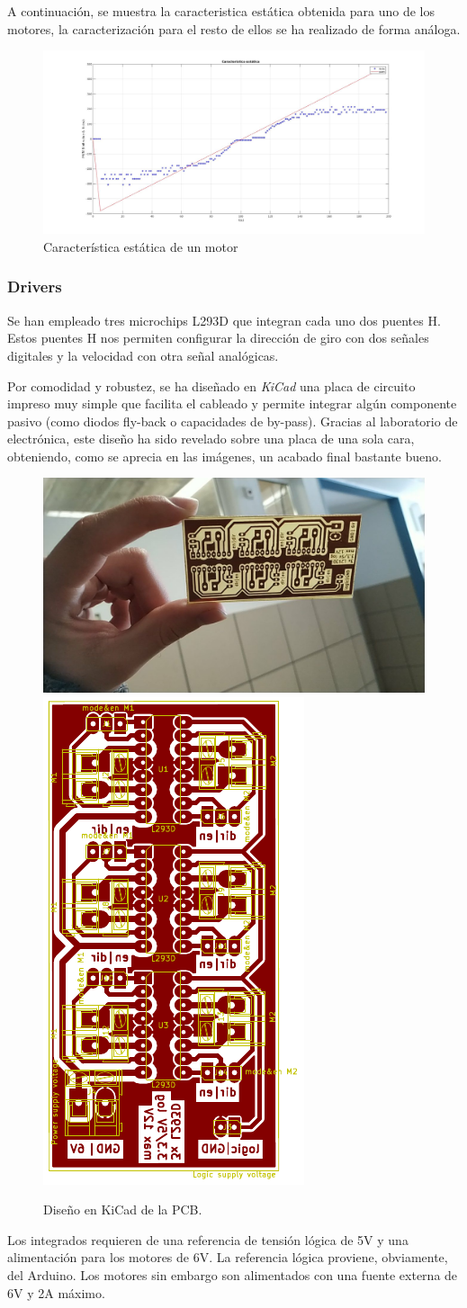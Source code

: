 A continuación, se muestra la caracteristica estática obtenida para uno de los motores, la caracterización para el resto de ellos se ha realizado de forma análoga. 
\begin{figure}[h!]
	\centering
	\includegraphics[width=.6\textwidth]{images/hw/estatica}
	\caption{Característica estática de un motor}
\end{figure}


\subsubsection{Drivers}
Se han empleado tres microchips L293D que integran cada uno dos puentes H. Estos puentes H nos permiten configurar la dirección de giro con dos señales digitales y la velocidad con otra señal analógicas.\par
Por comodidad y robustez, se ha diseñado en \textit{KiCad} una placa de circuito impreso muy simple que facilita el cableado y permite integrar algún 
componente pasivo (como diodos fly-back o capacidades de by-pass).
Gracias al laboratorio de electrónica, este diseño ha sido revelado sobre una placa de una sola cara, obteniendo, como se aprecia en las imágenes, 
un acabado final bastante bueno.
 \begin{figure}[h!]
	 \centering
	 \includegraphics[width=.6\textwidth]{images/hw/pcb_img}
 	\includegraphics[width=.2\textwidth]{images/hw/pcb_kicad}
 	\caption{Diseño en KiCad de la PCB.}
 \end{figure}
 \par
Los integrados requieren de una referencia de tensión lógica de 5V y una alimentación para los motores de 6V.
La referencia lógica proviene, obviamente, del Arduino. Los motores sin embargo son alimentados con una fuente externa de 6V y 2A máximo. \\

